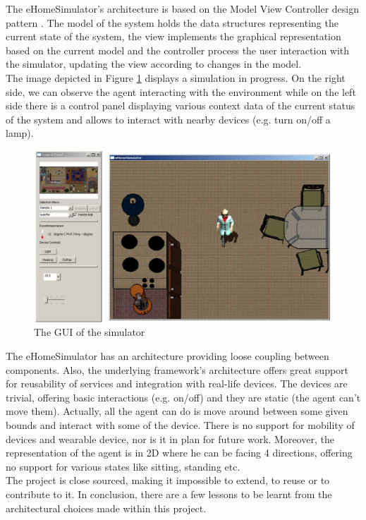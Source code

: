 The eHomeSimulator's architecture is based on the Model View Controller design pattern \cite{erich1995design}. The model of the system holds the data structures representing the current state of the system, the view implements the graphical representation based on the current model and the controller process the user interaction with the simulator, updating the view according to changes in the model.\\

The image depicted in Figure \ref{fig:simulated_env} displays a simulation in progress. On the right side, we can observe the agent interacting with the environment while on the left side there is a control panel displaying various context data of the current status of the system and allows to interact with nearby devices (e.g. turn on/off a lamp).

\begin{figure}[H]
	\centering
	\includegraphics[width=\linewidth]{gfx/Chapter2/simulated_env}
	\caption{The GUI of the simulator}
	\label{fig:simulated_env}
\end{figure}

The eHomeSimulator has an architecture providing loose coupling between components. Also, the underlying framework's architecture offers great support for reusability of services and integration with real-life devices. The devices are trivial, offering basic interactions (e.g. on/off) and they are static (the agent can't move them). Actually, all the agent can do is move around between some given bounds and interact with some of the device. There is no support for mobility of devices and wearable device, nor is it in plan for future work. Moreover, the representation of the agent is in 2D where he can be facing 4 directions, offering no support for various states like sitting, standing etc.\\

The project is close sourced, making it impossible to extend, to reuse or to contribute to it. In conclusion, there are a few lessons to be learnt from the architectural choices made within this project.
